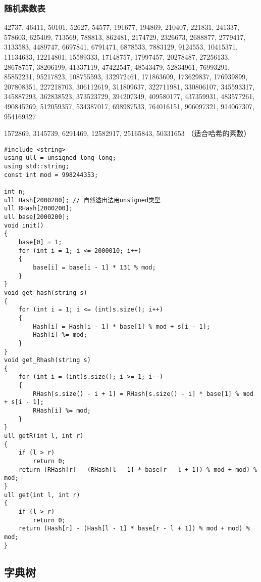 \documentclass[]{article}
\begin{document}
\hypertarget{ux968fux673aux7d20ux6570ux8868}{%
\subsubsection{随机素数表}\label{ux968fux673aux7d20ux6570ux8868}}

42737, 46411, 50101, 52627, 54577, 191677, 194869, 210407, 221831,
241337, 578603, 625409, 713569, 788813, 862481, 2174729, 2326673,
2688877, 2779417, 3133583, 4489747, 6697841, 6791471, 6878533, 7883129,
9124553, 10415371, 11134633, 12214801, 15589333, 17148757, 17997457,
20278487, 27256133, 28678757, 38206199, 41337119, 47422547, 48543479,
52834961, 76993291, 85852231, 95217823, 108755593, 132972461, 171863609,
173629837, 176939899, 207808351, 227218703, 306112619, 311809637,
322711981, 330806107, 345593317, 345887293, 362838523, 373523729,
394207349, 409580177, 437359931, 483577261, 490845269, 512059357,
534387017, 698987533, 764016151, 906097321, 914067307, 954169327

1572869, 3145739, 6291469, 12582917, 25165843, 50331653
（适合哈希的素数）

\begin{verbatim}
#include <string>
using ull = unsigned long long;
using std::string;
const int mod = 998244353;

int n;
ull Hash[2000200]; // 自然溢出法用unsigned类型
ull RHash[2000200];
ull base[2000200];
void init()
{
    base[0] = 1;
    for (int i = 1; i <= 2000010; i++)
    {
        base[i] = base[i - 1] * 131 % mod;
    }
}
void get_hash(string s)
{
    for (int i = 1; i <= (int)s.size(); i++)
    {
        Hash[i] = Hash[i - 1] * base[1] % mod + s[i - 1];
        Hash[i] %= mod;
    }
}
void get_Rhash(string s)
{
    for (int i = (int)s.size(); i >= 1; i--)
    {
        RHash[s.size() - i + 1] = RHash[s.size() - i] * base[1] % mod + s[i - 1];
        RHash[i] %= mod;
    }
}
ull getR(int l, int r)
{
    if (l > r)
        return 0;
    return (RHash[r] - (RHash[l - 1] * base[r - l + 1]) % mod + mod) % mod;
}
ull get(int l, int r)
{
    if (l > r)
        return 0;
    return (Hash[r] - (Hash[l - 1] * base[r - l + 1]) % mod + mod) % mod;
}
\end{verbatim}

\hypertarget{ux5b57ux5178ux6811}{%
\subsection{字典树}\label{ux5b57ux5178ux6811}}
\end{document}
